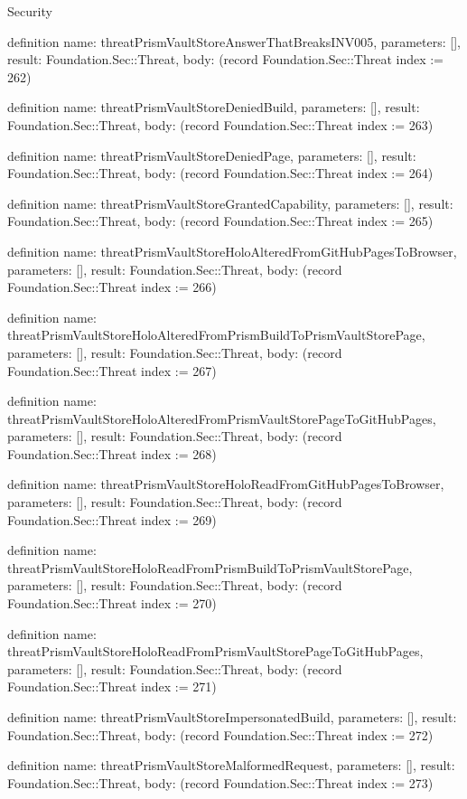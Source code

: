 \begin{lexlean}{Security}
\begin{semanticmodule}
definition{
  name: threatPrismVaultStoreAnswerThatBreaksINV005,
  parameters: [],
  result: Foundation.Sec::Threat,
  body: (record Foundation.Sec::Threat {index := 262})
}

definition{
  name: threatPrismVaultStoreDeniedBuild,
  parameters: [],
  result: Foundation.Sec::Threat,
  body: (record Foundation.Sec::Threat {index := 263})
}

definition{
  name: threatPrismVaultStoreDeniedPage,
  parameters: [],
  result: Foundation.Sec::Threat,
  body: (record Foundation.Sec::Threat {index := 264})
}

definition{
  name: threatPrismVaultStoreGrantedCapability,
  parameters: [],
  result: Foundation.Sec::Threat,
  body: (record Foundation.Sec::Threat {index := 265})
}

definition{
  name: threatPrismVaultStoreHoloAlteredFromGitHubPagesToBrowser,
  parameters: [],
  result: Foundation.Sec::Threat,
  body: (record Foundation.Sec::Threat {index := 266})
}

definition{
  name: threatPrismVaultStoreHoloAlteredFromPrismBuildToPrismVaultStorePage,
  parameters: [],
  result: Foundation.Sec::Threat,
  body: (record Foundation.Sec::Threat {index := 267})
}

definition{
  name: threatPrismVaultStoreHoloAlteredFromPrismVaultStorePageToGitHubPages,
  parameters: [],
  result: Foundation.Sec::Threat,
  body: (record Foundation.Sec::Threat {index := 268})
}

definition{
  name: threatPrismVaultStoreHoloReadFromGitHubPagesToBrowser,
  parameters: [],
  result: Foundation.Sec::Threat,
  body: (record Foundation.Sec::Threat {index := 269})
}

definition{
  name: threatPrismVaultStoreHoloReadFromPrismBuildToPrismVaultStorePage,
  parameters: [],
  result: Foundation.Sec::Threat,
  body: (record Foundation.Sec::Threat {index := 270})
}

definition{
  name: threatPrismVaultStoreHoloReadFromPrismVaultStorePageToGitHubPages,
  parameters: [],
  result: Foundation.Sec::Threat,
  body: (record Foundation.Sec::Threat {index := 271})
}

definition{
  name: threatPrismVaultStoreImpersonatedBuild,
  parameters: [],
  result: Foundation.Sec::Threat,
  body: (record Foundation.Sec::Threat {index := 272})
}

definition{
  name: threatPrismVaultStoreMalformedRequest,
  parameters: [],
  result: Foundation.Sec::Threat,
  body: (record Foundation.Sec::Threat {index := 273})
}


\end{semanticmodule}
\end{lexlean}
